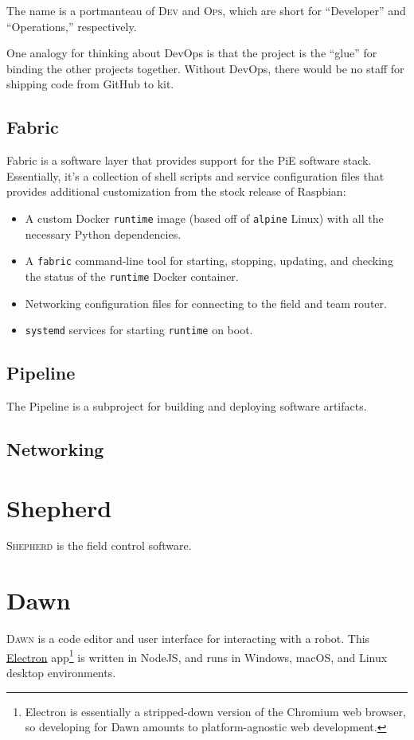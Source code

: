 \documentclass[12pt]{book}
\begin{document}
  The name is a portmanteau of \textsc{Dev} and \textsc{Ops}, which are short for ``Developer'' and ``Operations,'' respectively.

  One analogy for thinking about DevOps is that the project is the ``glue'' for binding the other projects together.
  Without DevOps, there would be no staff for shipping code from GitHub to kit.

  \section{Fabric}

  Fabric is a software layer that provides support for the PiE software stack.
  Essentially, it's a collection of shell scripts and service configuration files that provides additional customization from the stock release of Raspbian:
  \begin{itemize}
    \item A custom Docker \texttt{runtime} image (based off of \texttt{alpine} Linux) with all the necessary Python dependencies.
    \item A \texttt{fabric} command-line tool for starting, stopping, updating, and checking the status of the \texttt{runtime} Docker container.
    \item Networking configuration files for connecting to the field and team router.
    \item \texttt{systemd} services for starting \texttt{runtime} on boot.
  \end{itemize}

  \section{Pipeline}

  The Pipeline is a subproject for building and deploying software artifacts.

  \section{Networking}

  \chapter{Shepherd}

  \textsc{Shepherd} is the field control software.

  \chapter{Dawn}

  \textsc{Dawn} is a code editor and user interface for interacting with a robot.
  This \href{https://electronjs.org/}{Electron} app\footnote{Electron is essentially a stripped-down version of the Chromium web browser, so developing for Dawn amounts to platform-agnostic web development.} is written in NodeJS, and runs in Windows, macOS, and Linux desktop environments.

  \printglossaries
  \glsaddall
\end{document}

